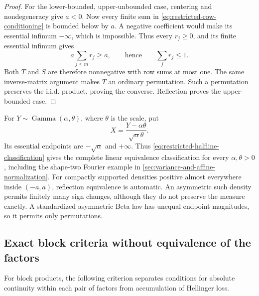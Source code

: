 \begin{proof}
For the lower-bounded, upper-unbounded case, centering and
nondegeneracy give \(a<0\).
Now every finite sum in \eqref{eq:restricted-row-conditioning}
is bounded below by \(a\).
A negative coefficient would make its essential infimum
\(-\infty\), which is impossible.
Thus every \(r_j\geq0\), and its finite essential infimum gives
\[
 a\sum_{j\leq m}r_j\geq a,
 \qquad\text{hence}\qquad \sum_jr_j\leq1.
\]
Both \(T\) and \(S\) are therefore nonnegative with row sums at
most one.
The same inverse-matrix argument makes \(T\) an ordinary
permutation.
Such a permutation preserves the i.i.d. product, proving the
converse.
Reflection proves the upper-bounded case.
\end{proof}

For \(Y\sim\operatorname{Gamma}(\alpha,\theta)\), where \(\theta\)
is the scale, put
\[
 X=\frac{Y-\alpha\theta}{\sqrt{\alpha}\theta}.
\]
Its essential endpoints are \(-\sqrt{\alpha}\) and \(+\infty\).
Thus \eqref{eq:restricted-halfline-classification} gives the complete
linear equivalence classification for every \(\alpha,\theta>0\),
including the shape-two Fourier example in
\cref{sec:variance-and-affine-normalization}.
For compactly supported densities positive almost everywhere inside
\((-a,a)\), reflection equivalence is automatic.
An asymmetric such density permits finitely many sign changes,
although they do not preserve the measure exactly.
A standardized asymmetric Beta law has unequal endpoint magnitudes,
so it permits only permutations.

\subsection{Exact block criteria without equivalence of the factors}
\label{sec:restricted-blocks}

For block products, the following criterion separates conditions for absolute
continuity within each pair of factors from accumulation of Hellinger loss.

